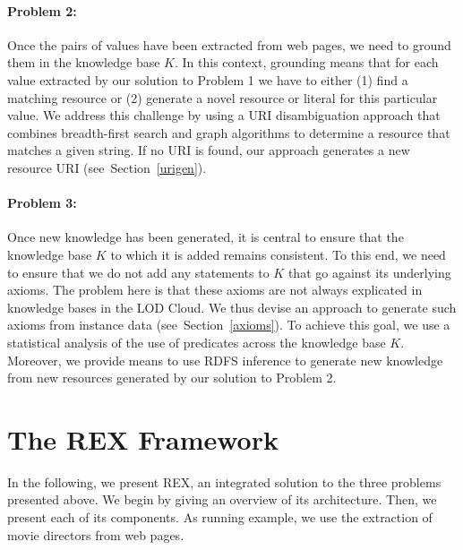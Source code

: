 \documentclass{llncs}
\begin{document}
\paragraph{Problem 2:}
Once the  pairs of values have been extracted from web pages, we need to ground them in the knowledge base $K$. 
In this context, grounding means that for each value extracted by our solution to Problem 1 we have to either (1) find a matching resource or (2) generate a novel resource or literal for this particular value. 
We address this challenge by using a URI disambiguation approach that combines breadth-first search and graph algorithms to determine a resource that matches a given string. 
If no URI is found, our approach generates a new resource URI (see~Section~\ref{urigen}).

\paragraph{Problem 3:}
Once new knowledge has been generated, it is central to ensure that the knowledge base $K$ to which it is added remains consistent. 
To this end, we need to ensure that we do not add any statements to $K$ that go against its underlying axioms. 
The problem here is that these axioms are not always explicated in knowledge bases in the LOD Cloud. 
We thus devise an approach to generate such axioms from instance data (see~Section~\ref{axioms}). 
To achieve this goal, we use a statistical analysis of the use of predicates across the knowledge base $K$. 
Moreover, we provide means to use RDFS inference to generate new knowledge from new resources generated by our solution to Problem 2.


\section{The REX Framework}
\label{sec:rex}
In the following, we present REX, an integrated  solution to the three problems presented above.
We begin by giving an overview of its architecture.
Then, we present each of its components.
As running example, we use the extraction of movie directors from web pages.
\end{document}
